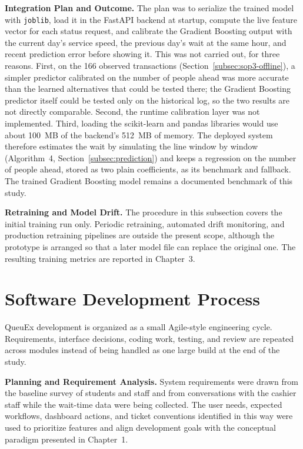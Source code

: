 \documentclass{research}
\newcommand{\sysname}{QueuEx}
\begin{document}
\textbf{Integration Plan and Outcome.} The plan was to serialize the
trained model with \texttt{joblib}, load it in the FastAPI backend at
startup, compute the live feature vector for each status request, and
calibrate the Gradient Boosting output with the current day's service
speed, the previous day's wait at the same hour, and recent prediction
error before showing it. This was not carried out, for three reasons.
First, on the 166 observed transactions
(Section~\ref{subsec:sop3-offline}), a simpler predictor calibrated on
the number of people ahead was more accurate than the learned
alternatives that could be tested there; the Gradient Boosting predictor
itself could be tested only on the historical log, so the two results
are not directly comparable. Second, the runtime calibration layer was
not implemented. Third, loading the scikit-learn and pandas libraries
would use about 100~MB of the backend's 512~MB of memory. The deployed
system therefore estimates the wait by simulating the line window by
window (Algorithm~4, Section~\ref{subsec:prediction}) and keeps a
regression on the number of people ahead, stored as two plain
coefficients, as its benchmark and fallback. The trained Gradient
Boosting model remains a documented benchmark of this study.

\textbf{Retraining and Model Drift.} The procedure in this subsection
covers the initial training run only. Periodic retraining, automated
drift monitoring, and production retraining pipelines are outside the
present scope, although the prototype is arranged so that a later model
file can replace the original one. The resulting training metrics are
reported in Chapter~3.

\section{Software Development Process}
\label{sec:sdp}

\sysname{} development is organized as a small Agile-style engineering
cycle. Requirements, interface decisions, coding work, testing, and
review are repeated across modules instead of being handled as one
large build at the end of the study.

\textbf{Planning and Requirement Analysis.} System requirements were
drawn from the baseline survey of students and staff and from
conversations with the cashier staff while the wait-time data were
being collected. The user needs, expected workflows, dashboard actions,
and ticket conventions identified in this way were used to prioritize
features and align development goals with the conceptual paradigm
presented in Chapter~1.
\end{document}
